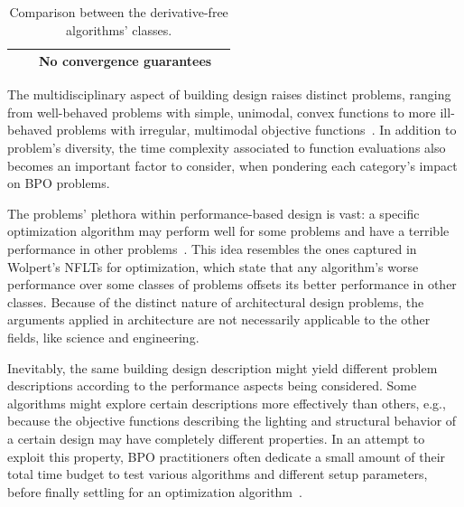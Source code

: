 \begin{table}[]
{\begin{tabular}{r|c|c|c|}
				\multicolumn{1}{|r|}{} &  & No convergence guarantees &  \\ \hline
			\end{tabular}%
		}
		\caption{Comparison between the derivative-free algorithms' classes.}
		\label{table:compare-dfo-algos}
	\end{table}
	
	The multidisciplinary aspect of building design raises distinct problems, ranging from well-behaved problems with simple, unimodal, convex functions to more ill-behaved problems with irregular, multimodal objective functions~\cite{Wortmann2017ADO}. In addition to problem's diversity, the time complexity associated to function evaluations also becomes an important factor to consider, when pondering each category's impact on \ac{BPO} problems.
	
	The problems' plethora within performance-based design is vast: a specific optimization algorithm may perform well for some problems and have a terrible performance in other problems~\cite{Wortmann2017GABESTCHOICE, Fang2017}. This idea resembles the ones captured in Wolpert's \acp{NFLT} for optimization, which state that any algorithm's worse performance over some classes of problems offsets its better performance in other classes. Because of the distinct nature of architectural design problems, the arguments applied in architecture are not necessarily applicable to the other fields, like science and engineering. 
	
	Inevitably, the same building design description might yield different problem descriptions according to the performance aspects being considered. Some algorithms might explore certain descriptions more effectively than others, e.g., because the objective functions describing the lighting and structural behavior of a certain design may have completely different properties. In an attempt to exploit this property, \ac{BPO} practitioners often dedicate a small amount of their total time budget to test various algorithms and different setup parameters, before finally settling for an optimization algorithm~\cite{Hamdy2016}.	
	
